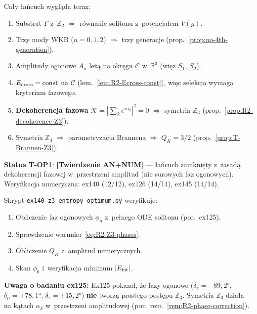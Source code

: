 \begin{remark}
Ca\l{}y \l{}a\'ncuch wygl\k{a}da teraz:
\begin{enumerate}[nosep]
  \item Substrat $\Gamma$ z~$\mathbb{Z}_2$ $\Rightarrow$
    r\'ownanie solitonu z~potencja\l{}em $V(g)$.
  \item Trzy mody WKB ($n = 0, 1, 2$) $\Rightarrow$
    trzy generacje (prop.~\ref{prop:no-4th-generation}).
  \item Amplitudy ogonowe $A_n$ le\.z\k{a} na okr\k{e}gu
    $\mathcal{C}$ w~$\mathbb{R}^3$ (wi\k{e}z $S_1$, $S_2$).
  \item $E_{\rm cross} = \mathrm{const}$ na $\mathcal{C}$
    (lem.~\ref{lem:R2-Ecross-const}), wi\k{e}c selekcja
    wymaga kryterium fazowego.
  \item \textbf{Dekoherencja fazowa}
    $\mathcal{K} = |\sum_k e^{i\alpha_k}|^2 = 0$
    $\Rightarrow$ symetria $\mathbb{Z}_3$
    (prop.~\ref{prop:R2-decoherence-Z3}).
  \item Symetria $\mathbb{Z}_3$ $\Rightarrow$
    parametryzacja Brannena $\Rightarrow$ $Q_K = 3/2$
    (prop.~\ref{prop:T-Brannen-Z3}).
\end{enumerate}

\textbf{Status T-OP1}: \textbf{[Twierdzenie AN+NUM]} ---
\l{}a\'ncuch zamkni\k{e}ty z~zasad\k{a} dekoherencji fazowej
w~przestrzeni amplitud (nie surowych faz ogonowych).
Weryfikacja numeryczna: ex140 (12/12), ex126 (14/14),
ex145 (14/14).
\end{remark}

\begin{remark}\label{rem:R2-numerical}
Skrypt \texttt{ex140\_z3\_entropy\_optimum.py} weryfikuje:
\begin{enumerate}[nosep]
  \item Obliczenie faz ogonowych $\phi_n$ z~pe\l{}nego
    ODE solitonu (por.~ex125).
  \item Sprawdzenie warunku~\eqref{eq:R2-Z3-phases}.
  \item Obliczenie $Q_K$ z~amplitud numerycznych.
  \item Skan $\phi_0$ i~weryfikacja minimum $|E_{\rm int}|$.
\end{enumerate}

\textbf{Uwaga o bada\-niu ex125:}
Ex125 pokaza\l{}, \.ze fazy ogonowe ($\delta_e = -89{,}2°$,
$\delta_\mu = +78{,}1°$, $\delta_\tau = +15{,}2°$)
\textbf{nie} tworz\k{a} prostego post\k{e}pu $\mathbb{Z}_3$.
Symetria $\mathbb{Z}_3$ dzia\l{}a na k\k{a}tach $\alpha_k$
w~przestrzeni amplitudowej
(por.~rem.~\ref{rem:R2-phase-correction}).
\end{remark}

